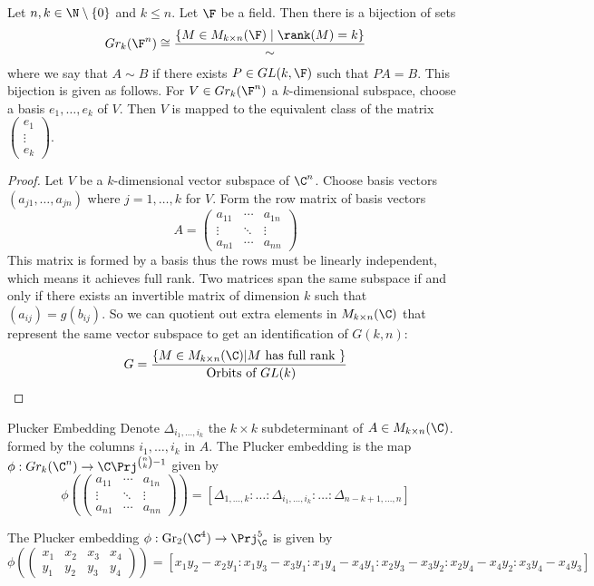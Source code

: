\documentclass[a4paper]{article}
\begin{document}
\begin{lmm}{}{} Let $n,k\in\N\setminus\{0\}$ and $k\leq n$. Let $\F$ be a field. Then there is a bijection of sets $$ Gr_k(\F^n)\cong\frac{\{M\in M_{k\times n}(\F)\;|\;\rank(M)=k\}}{\sim}$$ where we say that $A\sim B$ if there exists $P\in GL(k,\F)$ such that $PA=B$. This bijection is given as follows. For $V\in Gr_k(\F^n)$ a $k$-dimensional subspace, choose a basis $e_1,\dots,e_k$ of $V$. Then $V$ is mapped to the equivalent class of the matrix $\begin{pmatrix}
e_1\\\vdots\\e_k
\end{pmatrix}$. 
\begin{proof}
Let $V$ be a $k$-dimensional vector subspace of $\C^n$. Choose basis vectors $(a_{j1},\dots,a_{jn})$ where $j=1,\dots,k$ for $V$. Form the row matrix of basis vectors $$A=\begin{pmatrix}a_{11} & \cdots & a_{1n}\\\vdots & \ddots & \vdots\\ a_{n1} & \cdots & a_{nn}\end{pmatrix}$$
This matrix is formed by a basis thus the rows must be linearly independent, which means it achieves full rank. Two matrices span the same subspace if and only if there exists an invertible matrix of dimension $k$ such that $(a_{ij})=g(b_{ij})$. So we can quotient out extra elements in $M_{k\times n}(\C)$ that represent the same vector subspace to get an identification of $G(k,n)$: $$G=\frac{\{M\in M_{k\times n}(\C)|M\text{ has full rank }\}}{\text{ Orbits of }GL(k)}$$ 
\end{proof}
\end{lmm}

\begin{defn}{Plucker Embedding}{} Denote $\Delta_{i_1,\dots,i_k}$ the $k\times k$ subdeterminant of $A\in M_{k\times n}(\C)$. formed by the columns $i_1,\dots,i_k$ in $A$. The Plucker embedding is the map $\phi: Gr_k(\C^n)\to\C\Prj^{\binom{n}{k}-1}$ given by $$\phi\left(\begin{pmatrix}a_{11} & \cdots & a_{1n}\\\vdots & \ddots & \vdots\\ a_{n1} & \cdots & a_{nn}\end{pmatrix}\right)=[\Delta_{1,\dots,k}:\dots:\Delta_{i_1,\dots,i_k}:\dots:\Delta_{n-k+1,\dots,n}]$$ 
\end{defn}

\begin{eg}{}{} The Plucker embedding $\phi:\text{Gr}_2(\C^4)\to\Prj_\C^5$ is given by $$\phi\left(\begin{pmatrix}
x_1 & x_2 & x_3 & x_4\\
y_1 & y_2 & y_3 & y_4
\end{pmatrix}\right)=[x_1y_2-x_2y_1:x_1y_3-x_3y_1:x_1y_4-x_4y_1:x_2y_3-x_3y_2:x_2y_4-x_4y_2:x_3y_4-x_4y_3]$$
\end{eg}
\end{document}
